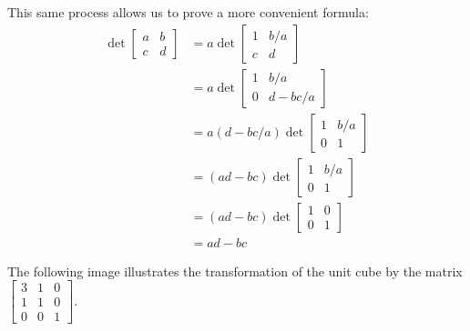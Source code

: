 \begin{applicationActivities}{2}{26}
\begin{fact}
  This same process allows us to prove a more convenient formula:
    \begin{align*}
    \det\begin{bmatrix} a & b \\ c & d \end{bmatrix}
  &=
    a
    \det\begin{bmatrix} 1 & b/a \\ c & d \end{bmatrix}
  \\ &=
    a
    \det\begin{bmatrix} 1 & b/a \\ 0 & d-bc/a \end{bmatrix}
  \\ &=
    a(d-bc/a)
    \det\begin{bmatrix} 1 & b/a \\ 0 & 1 \end{bmatrix}
  \\ &=
    (ad-bc)
    \det\begin{bmatrix} 1 & b/a \\ 0 & 1 \end{bmatrix}
  \\ &=
    (ad-bc)
    \det\begin{bmatrix} 1 & 0 \\ 0 & 1 \end{bmatrix}
  \\ &=
    ad-bc
    \end{align*}
\end{fact}


\begin{activity}{5}
  The following image illustrates the transformation of the unit cube
  by the matrix
  $\begin{bmatrix} 3 & 1 & 0 \\  1 & 1 & 0 \\  0 & 0 & 1\end{bmatrix}$.

  \begin{center}
\end{center}
\end{activity}
\end{applicationActivities}
